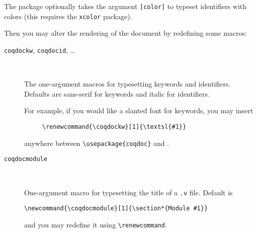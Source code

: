 The package optionally takes the argument \verb|[color]| to typeset
identifiers with colors (this requires the \verb|xcolor| package).

Then you may alter the rendering of the document by
redefining some macros:
\begin{description}

\item[\texttt{coqdockw}, \texttt{coqdocid}, \ldots] ~ 
  
  The one-argument macros for typesetting keywords and identifiers.
  Defaults are sans-serif for keywords and italic for identifiers.

  For example, if you would like a slanted font for keywords, you
  may insert  
\begin{verbatim}
     \renewcommand{\coqdockw}[1]{\textsl{#1}}
\end{verbatim}
  anywhere between \verb|\usepackage{coqdoc}| and
  \verb||. 

\item[\texttt{coqdocmodule}] ~ 
  
  One-argument macro for typesetting the title of a \verb|.v| file.
  Default is
\begin{verbatim}
\newcommand{\coqdocmodule}[1]{\section*{Module #1}}
\end{verbatim}
  and you may redefine it using \verb|\renewcommand|.

\end{description}


